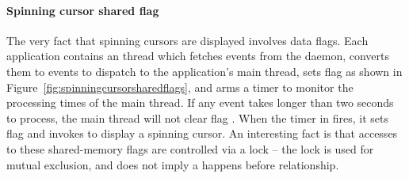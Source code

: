 
\paragraph{Spinning cursor shared flag}
The very fact that spinning cursors are displayed involves data
flags. Each application contains an  thread which fetches
 events from the  daemon, converts them
to  events to dispatch to the application's main thread, sets
flag  as shown in
Figure~\ref{fig:spinningcursorsharedflags}, and arms a timer to monitor
the processing times of the main thread.  If any  event takes
longer than two seconds to process, the main thread will not clear flag
.  When the timer in 
fires, it sets flag  and invokes
 to display a spinning cursor.  An interesting fact is
that accesses to these shared-memory flags are controlled via a lock --
the lock is used for mutual exclusion, and does not imply a happens before
relationship.


